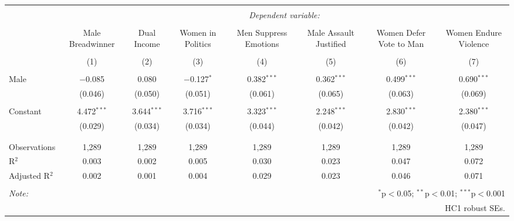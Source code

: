 
\begin{table}[!htbp] \centering 
  \caption{} 
  \label{} 
\begin{tabular}{@{\extracolsep{5pt}}lccccccc} 
\\[-1.8ex]\hline 
\hline \\[-1.8ex] 
 & \multicolumn{7}{c}{\textit{Dependent variable:}} \\ 
\cline{2-8} 
\\[-1.8ex] & Male Breadwinner & Dual Income & Women in Politics & Men Suppress Emotions & Male Assault Justified & Women Defer Vote to Man & Women Endure Violence \\ 
\\[-1.8ex] & (1) & (2) & (3) & (4) & (5) & (6) & (7)\\ 
\hline \\[-1.8ex] 
 Male & $-$0.085 & 0.080 & $-$0.127$^{*}$ & 0.382$^{***}$ & 0.362$^{***}$ & 0.499$^{***}$ & 0.690$^{***}$ \\ 
  & (0.046) & (0.050) & (0.051) & (0.061) & (0.065) & (0.063) & (0.069) \\ 
  & & & & & & & \\ 
 Constant & 4.472$^{***}$ & 3.644$^{***}$ & 3.716$^{***}$ & 3.323$^{***}$ & 2.248$^{***}$ & 2.830$^{***}$ & 2.380$^{***}$ \\ 
  & (0.029) & (0.034) & (0.034) & (0.044) & (0.042) & (0.042) & (0.047) \\ 
  & & & & & & & \\ 
\hline \\[-1.8ex] 
Observations & 1,289 & 1,289 & 1,289 & 1,289 & 1,289 & 1,289 & 1,289 \\ 
R$^{2}$ & 0.003 & 0.002 & 0.005 & 0.030 & 0.023 & 0.047 & 0.072 \\ 
Adjusted R$^{2}$ & 0.002 & 0.001 & 0.004 & 0.029 & 0.023 & 0.046 & 0.071 \\ 
\hline 
\hline \\[-1.8ex] 
\textit{Note:}  & \multicolumn{7}{r}{$^{*}$p$<$0.05; $^{**}$p$<$0.01; $^{***}$p$<$0.001} \\ 
 & \multicolumn{7}{r}{HC1 robust SEs.} \\ 
\end{tabular} 
\end{table} 
